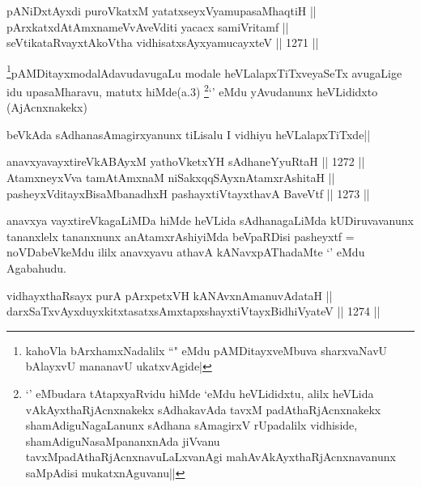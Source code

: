 
\begin{shl}
pANiDxtAyxdi puroVkatxM yatatxseyxVyamupasaMhaqtiH || \\
pArxkatxdAtAmxnameVvAveVditi yacacx samiVritamf || \\
seVtikataRvayxtAkoV\s tha vidhisatxsAyxyamucayxteV ||  1271 ||  
\end{shl}

\begin{artha}
\footnote{kahoVla bArxhamxNadalilx ``\stext" eMdu pAMDitayxveMbuva sharxvaNavU bAlayxvU mananavU ukatxvAgide|}pAMDitayxmodalAdavudavugaLu modale heVLalapxTiTxveyaSeTx avugaLige idu upasaMharavu, matutx hiMde(a.3) \footnote{`\stext' eMbudara tAtapxyaRvidu hiMde `\stext eMdu heVLididxtu, alilx heVLida vAkAyxthaRjAcnxnakekx sAdhakavAda tavxM padAthaRjAcnxnakekx shamAdiguNagaLanunx sAdhana sAmagirxV rUpadalilx vidhiside, shamAdiguNasaMpananxnAda jiVvanu tavxMpadAthaRjAcnxnavuLaLxvanAgi mahAvAkAyxthaRjAcnxnavanunx saMpAdisi mukatxnAguvanu||}`\stext' eMdu yAvudanunx heVLididxto (AjAcnxnakekx)
\end{artha}

\begin{artha}
beVkAda sAdhanasAmagirxyanunx tiLisalu I vidhiyu heVLalapxTiTxde||
\end{artha}

\begin{shl}
anavxyavayxtireVkABAyxM yathoVketxYH sAdhaneYyuRtaH ||  1272 ||  \\
AtamxneyxVva tamAtAmxnaM niSakxqqSAyxnAtamxrAshitaH ||  \\
pasheyxVditayxBisaMbanadhxH pashayxtiVtayxthavA BaveVtf ||  1273 ||  
\end{shl}

\begin{artha}
anavxya vayxtireVkagaLiMDa hiMde heVLida sAdhanagaLiMda kUDiruvavanunx tananxlelx tananxnunx anAtamxrAshiyiMda beVpaRDisi pasheyxtf = noVDabeVkeMdu ililx anavxyavu athavA kANavxpAThadaMte `\stext' eMdu Agabahudu.
\end{artha}


\begin{shl}
vidhayxthaRsayx purA pArxpetxVH kANAvxnAmanuvAdataH || \\
darxSaTxvAyxduyxkitxtasatxsAmxtapxshayxtiVtayxBidhiVyateV ||  1274 ||  
\end{shl}

